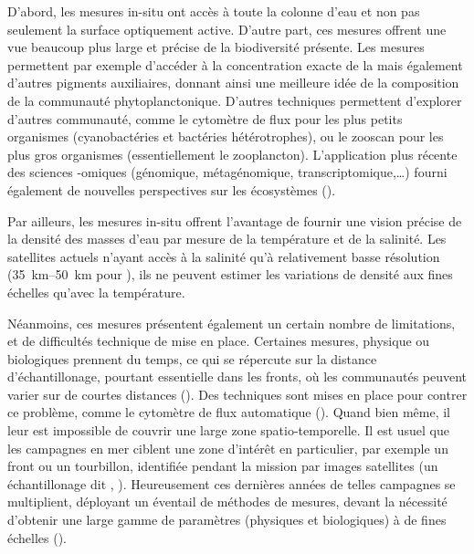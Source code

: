 D'abord, les mesures in-situ ont accès à toute la colonne d'eau et non pas seulement la surface optiquement active.
D'autre part, ces mesures offrent une vue beaucoup plus large et précise de la biodiversité présente.
Les mesures  permettent par exemple d'accéder à la concentration exacte de la  mais également d'autres pigments auxiliaires, donnant ainsi une meilleure idée de la composition de la communauté phytoplanctonique.
D'autres techniques permettent d'explorer d'autres communauté, comme le cytomètre de flux pour les plus petits organismes (cyanobactéries et bactéries hétérotrophes), ou le zooscan pour les plus gros organismes (essentiellement le zooplancton).
L'application plus récente des sciences -omiques (génomique, métagénomique, transcriptomique,\dots) fourni également de nouvelles perspectives sur les écosystèmes (\cite{bork_2015,richter_2022,sunagawa_2020}).

Par ailleurs, les mesures in-situ offrent l'avantage de fournir une vision précise de la densité des masses d'eau par mesure de la température et de la salinité.
Les satellites actuels n'ayant accès à la salinité qu'à relativement basse résolution (\qtyrange{35}{50}{\km} pour  ), ils ne peuvent estimer les variations de densité aux fines échelles qu'avec la température.

Néanmoins, ces mesures présentent également un certain nombre de limitations, et de difficultés technique de mise en place.
Certaines mesures, physique ou biologiques  prennent du temps, ce qui se répercute sur la distance d'échantillonage, pourtant essentielle dans les fronts, où les communautés peuvent varier sur de courtes distances (\cite{chekalyuk_2012,mangolte_2023}).
Des techniques sont mises en place pour contrer ce problème, comme le cytomètre de flux automatique (\cite{thyssen_2015}).
Quand bien même, il leur est impossible de couvrir une large zone spatio-temporelle.
Il est usuel que les campagnes en mer ciblent une zone d'intérêt en particulier, par exemple un front ou un tourbillon, identifiée pendant la mission par images satellites (un échantillonage dit , \cite{marrec_2018,tzortzis_2021}).
Heureusement ces dernières années de telles campagnes se multiplient, déployant un éventail de méthodes de mesures, devant la nécessité d'obtenir une large gamme de paramètres (physiques et biologiques) à de fines échelles (\cite{shulman_2015,barcelo-llull_2021,marrec_2018,freilich_2021,tzortzis_2021,wilson_2021}).

